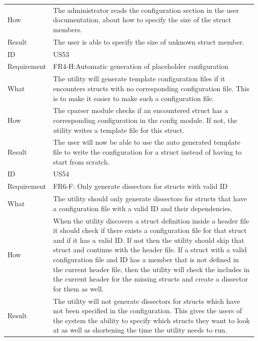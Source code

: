 \begin{table}[htbp]
{\begin{tabularx}{1.2\textwidth}{l X}
	How & The administrator reads the configuration section in the user documentation, about how to specify the size of the \gls{struct} \glspl{member}. \\
	Result & The user is able to specify the size of unknown \gls{struct} \gls{member}. \\	
	\midrule
	ID & US53 \\
	Requirement & FR4-H:Automatic generation of placeholder configuration \\
	What & The \gls{utility} will generate template configuration files if it encounters \glspl{struct} with no corresponding configuration file. This is to make it easier to make such a configuration file.   \\
	How & The cparser module checks if an encountered \gls{struct} has a corresponding configuration in the config module. If not, the \gls{utility} writes a template file for this \gls{struct}.   \\
	Result & The user will now be able to use the auto generated template file to write the configuration for a \gls{struct} instead of having to start from scratch. \\
	\midrule
	ID & US54 \\
	Requirement &  FR6-F: Only generate dissectors for structs with valid ID \\
	What & The \gls{utility} should only generate \glspl{dissector} for \glspl{struct} that have a configuration file with a valid ID and their dependencies.    \\
	How & When the \gls{utility} discovers a \gls{struct} definition inside a \gls{header} file it should check if there exists a configuration file for that \gls{struct} and if it has a valid ID.
	If not then the \gls{utility} should skip that \gls{struct} and continue with the \gls{header} file. If a \gls{struct} with a valid configuration file and ID has a \gls{member} that is not defined in the current \gls{header}
	file, then the \gls{utility} will check the includes in the current \gls{header} for the missing \glspl{struct} and create a \gls{dissector} for them as well.\\
	Result & The \gls{utility} will not generate \glspl{dissector} for \glspl{struct} which have not been specified in the configuration.
	This gives the users of the system the ability to specify which \glspl{struct} they want to look at as well as shortening the time the \gls{utility} needs to run. \\
	\bottomrule
\end{tabularx}}
\end{table}

